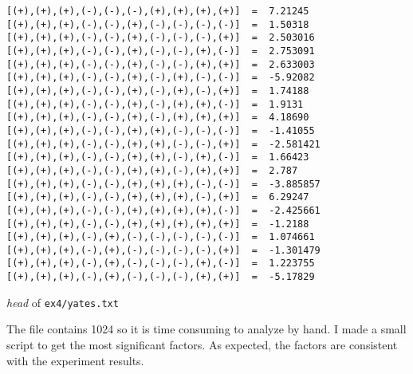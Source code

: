 \documentclass[12pt, a4paper]{article} %
\theoremstyle{definition}
\newcommand{\code}[1]{\texttt{#1}} %
\begin{document}
\begin{listing}[H]
  \begin{verbatim}
[(+),(+),(+),(-),(-),(-),(+),(+),(+),(+)]  =  7.21245
[(+),(+),(+),(-),(-),(+),(-),(-),(-),(-)]  =  1.50318
[(+),(+),(+),(-),(-),(+),(-),(-),(-),(+)]  =  2.503016
[(+),(+),(+),(-),(-),(+),(-),(-),(+),(-)]  =  2.753091
[(+),(+),(+),(-),(-),(+),(-),(-),(+),(+)]  =  2.633003
[(+),(+),(+),(-),(-),(+),(-),(+),(-),(-)]  =  -5.92082
[(+),(+),(+),(-),(-),(+),(-),(+),(-),(+)]  =  1.74188
[(+),(+),(+),(-),(-),(+),(-),(+),(+),(-)]  =  1.9131
[(+),(+),(+),(-),(-),(+),(-),(+),(+),(+)]  =  4.18690
[(+),(+),(+),(-),(-),(+),(+),(-),(-),(-)]  =  -1.41055
[(+),(+),(+),(-),(-),(+),(+),(-),(-),(+)]  =  -2.581421
[(+),(+),(+),(-),(-),(+),(+),(-),(+),(-)]  =  1.66423
[(+),(+),(+),(-),(-),(+),(+),(-),(+),(+)]  =  2.787
[(+),(+),(+),(-),(-),(+),(+),(+),(-),(-)]  =  -3.885857
[(+),(+),(+),(-),(-),(+),(+),(+),(-),(+)]  =  6.29247
[(+),(+),(+),(-),(-),(+),(+),(+),(+),(-)]  =  -2.425661
[(+),(+),(+),(-),(-),(+),(+),(+),(+),(+)]  =  -1.2188
[(+),(+),(+),(-),(+),(-),(-),(-),(-),(-)]  =  1.074661
[(+),(+),(+),(-),(+),(-),(-),(-),(-),(+)]  =  -1.301479
[(+),(+),(+),(-),(+),(-),(-),(-),(+),(-)]  =  1.223755
[(+),(+),(+),(-),(+),(-),(-),(-),(+),(+)]  =  -5.17829
  \end{verbatim}
  \caption{\textit{head} of \code{ex4/yates.txt}}
\end{listing}

The file contains 1024 so it is time consuming to analyze by hand. I made a small script to get the most significant factors. As expected, the factors are consistent with the experiment results.
\end{document}
